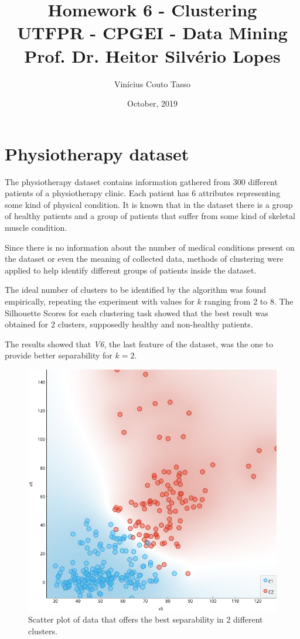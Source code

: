 \documentclass{article}
\title{Homework 6 - Clustering \\
        \vspace{5px} \large UTFPR - CPGEI - Data Mining \\
        Prof. Dr. Heitor Silvério Lopes}
\author{Vinícius Couto Tasso}
\date{October, 2019}
\begin{document}
\maketitle

\section*{Physiotherapy dataset}


\indent The physiotherapy dataset contains information gathered from 300 different patients of a physiotherapy clinic. Each patient has 6 attributes representing some kind of physical condition. It is known that in the dataset there is a group of healthy patients and a group of patients that suffer from some kind of skeletal muscle condition.

Since there is no information about the number of medical conditions present on the dataset or even the meaning of collected data, methods of clustering were applied to help identify different groups of patients inside the dataset.


The ideal number of clusters to be identified by the algorithm was found empirically, repeating the experiment with values for $k$ ranging from 2 to 8. The Silhouette Scores for each clustering task showed that the best result was obtained for 2 clusters, supposedly healthy and non-healthy patients.

The results showed that \textit{V6}, the last feature of the dataset, was the one to provide better separability for $k = 2$.

\begin{figure}[htbp]
\centering
    \includegraphics[scale=0.5]{v5vsv6.png}
    \caption{Scatter plot of data that offers the best separability in 2 different clusters.}
    \label{fig:kmeans_scatter_plot}%
\end{figure}
\end{document}
